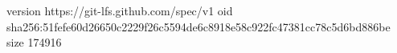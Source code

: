 version https://git-lfs.github.com/spec/v1
oid sha256:51fefe60d26650c2229f26c5594de6c8918e58c922fc47381cc78c5d6bd886be
size 174916
